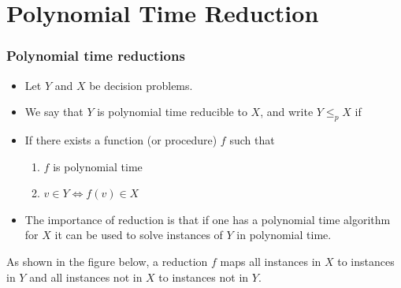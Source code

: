 \documentclass{beamer}
\begin{document}
\section{Polynomial Time Reduction}
\begin{frame}
  \frametitle{Polynomial time reductions}
  \begin{itemize}
  \item Let $Y$ and $X$ be decision problems.
  \item We say that $Y$ is polynomial time reducible to $X$, and write $Y\le_pX$ if
  \item If there exists a function (or procedure) $f$ such that 
    \begin{enumerate}

   \item $f$ is polynomial time
   \item $v\in Y\Leftrightarrow f(v)\in X$
    \end{enumerate}
\item The importance of reduction is that if one has a polynomial time algorithm for $X$ it can be used to solve instances of $Y$ in polynomial time.
  \end{itemize}
\end{frame}
\begin{frame}
  As shown in the figure below, a reduction $f$ maps all instances in $X$ to instances in $Y$ 
  and all instances not in $X$ to instances not in $Y$.
\end{frame}
\end{document}
